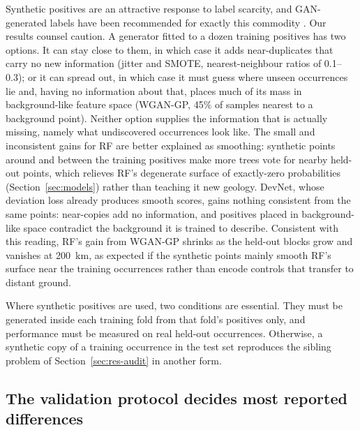 \documentclass[pdflatex,sn-apa]{sn-jnl}
\begin{document}
Synthetic positives are an attractive response to label scarcity, and GAN-generated labels have been recommended for exactly this commodity \citep{Parsa2025}. Our results counsel caution. A generator fitted to a dozen training positives has two options. It can stay close to them, in which case it adds near-duplicates that carry no new information (jitter and SMOTE, nearest-neighbour ratios of 0.1--0.3); or it can spread out, in which case it must guess where unseen occurrences lie and, having no information about that, places much of its mass in background-like feature space (WGAN-GP, 45\% of samples nearest to a background point). Neither option supplies the information that is actually missing, namely what undiscovered occurrences look like. The small and inconsistent gains for RF are better explained as smoothing: synthetic points around and between the training positives make more trees vote for nearby held-out points, which relieves RF's degenerate surface of exactly-zero probabilities (Section~\ref{sec:models}) rather than teaching it new geology. DevNet, whose deviation loss already produces smooth scores, gains nothing consistent from the same points: near-copies add no information, and positives placed in background-like space contradict the background it is trained to describe. Consistent with this reading, RF's gain from WGAN-GP shrinks as the held-out blocks grow and vanishes at 200~km, as expected if the synthetic points mainly smooth RF's surface near the training occurrences rather than encode controls that transfer to distant ground.

Where synthetic positives are used, two conditions are essential. They must be generated inside each training fold from that fold's positives only, and performance must be measured on real held-out occurrences. Otherwise, a synthetic copy of a training occurrence in the test set reproduces the sibling problem of Section~\ref{sec:res-audit} in another form.

\subsection{The validation protocol decides most reported differences}\label{sec:disc-protocol}
\end{document}
